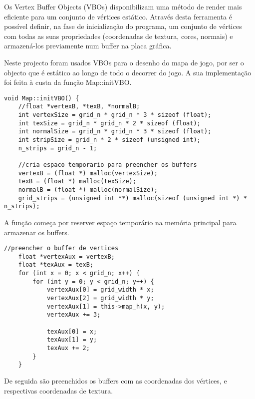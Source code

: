 Os Vertex Buffer Objects (VBOs) disponibilizam uma método de render mais eficiente para um conjunto de vértices estático. Através desta ferramenta é possível definir, na fase de inicialização do programa, um conjunto de vértices com todas as suas propriedades (coordenadas de textura, cores, normais) e armazená-los previamente num buffer na placa gráfica.

Neste projecto foram usados VBOs para o desenho do mapa de jogo, por ser o objecto que é estático ao longo de todo o decorrer do jogo. A sua implementação foi feita à custa da função Map::initVBO.

\begin{lstlisting}[caption=Cálculo dos buffers para VBOs (alocação)]
void Map::initVBO() {
	//float *vertexB, *texB, *normalB;
	int vertexSize = grid_n * grid_n * 3 * sizeof (float);
	int texSize = grid_n * grid_n * 2 * sizeof (float);
	int normalSize = grid_n * grid_n * 3 * sizeof (float);
	int stripSize = grid_n * 2 * sizeof (unsigned int);
	n_strips = grid_n - 1;

	//cria espaco temporario para preencher os buffers
	vertexB = (float *) malloc(vertexSize);
	texB = (float *) malloc(texSize);
	normalB = (float *) malloc(normalSize);
	grid_strips = (unsigned int **) malloc(sizeof (unsigned int *) * n_strips);
\end{lstlisting}
A função começa por reserver espaço temporário na memória principal para armazenar os buffers.

\begin{lstlisting}[caption=Cálculo dos buffers para VBOs (vértices)]
	//preencher o buffer de vertices
	float *vertexAux = vertexB;
	float *texAux = texB;
	for (int x = 0; x < grid_n; x++) {
		for (int y = 0; y < grid_n; y++) {
			vertexAux[0] = grid_width * x;
			vertexAux[2] = grid_width * y;
			vertexAux[1] = this->map_h(x, y);
			vertexAux += 3;

			texAux[0] = x;
			texAux[1] = y;
			texAux += 2;
		}
	}
\end{lstlisting}
De seguida são preenchidos os buffers com as coordenadas dos vértices, e respectivas coordenadas de textura.

